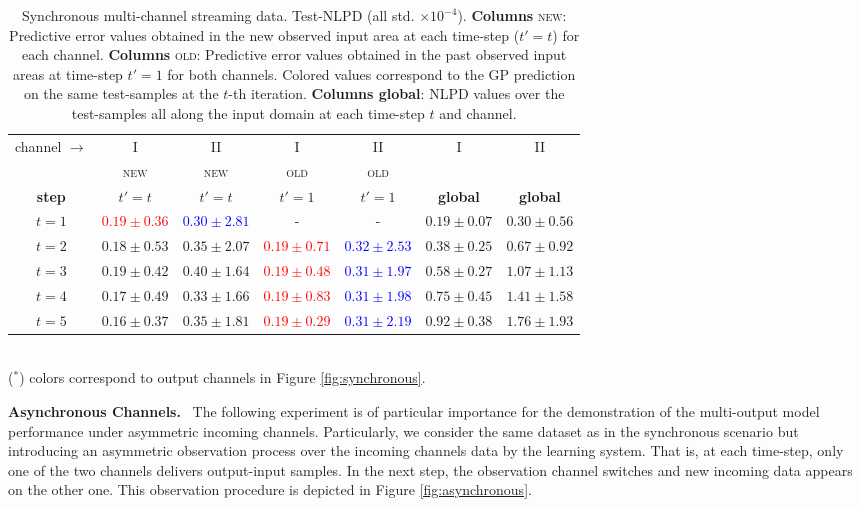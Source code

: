 \documentclass[]{article}
\begin{document}
\begin{table}[]
	\centering
	\caption{Synchronous multi-channel streaming data. Test-NLPD (all std. $\times 10^{-4}$). \textbf{Columns} \textsc{new}: Predictive error values obtained in the new observed input area at each time-step ($t'=t$) for each channel. \textbf{Columns} \textsc{old}: Predictive error values obtained in the past observed input areas at time-step $t'=1$ for both channels. Colored values correspond to the GP prediction on the same test-samples at the $t$-th iteration. \textbf{Columns global}: NLPD values over the test-samples all along the input domain at each time-step $t$ and channel.}
	\begin{tabular}{ccccccc}
		\toprule
		channel $\rightarrow$& I &II& I& II & I & II\\
		& \textsc{new} & \textsc{new}  & \textsc{old} & \textsc{old} &  &\\
		\textbf{step} & $t'=t$ &  $t'=t$ & $t'=1$ & $t'=1$ & \textbf{global} & \textbf{global}\\
		\midrule
		$t=1$ & \textcolor{red}{$\mathbf{0.19 \pm 0.36}$} & \textcolor{blue}{$\mathbf{0.30 \pm 2.81}$} & - & - & $0.19 \pm 0.07$ & $0.30 \pm 0.56$ \\
		$t=2$ & $0.18 \pm 0.53$ & $0.35 \pm 2.07$ & \textcolor{red}{$0.19 \pm 0.71$} & \textcolor{blue}{$0.32 \pm 2.53$} &$0.38 \pm 0.25$& $0.67 \pm 0.92$ \\
		$t=3$ & $0.19 \pm 0.42$ & $0.40\pm 1.64$ & \textcolor{red}{$0.19 \pm 0.48$} & \textcolor{blue}{$0.31 \pm 1.97$} & $0.58 \pm 0.27$& $1.07 \pm 1.13$\\
		$t=4$ & $0.17 \pm 0.49$ & $0.33 \pm 1.66$ & \textcolor{red}{$0.19 \pm 0.83$} & \textcolor{blue}{$0.31 \pm 1.98$} &$0.75 \pm 0.45$ & $1.41 \pm 1.58$\\
		$t=5$ & $0.16 \pm 0.37$ & $0.35 \pm 1.81$ & \textcolor{red}{$0.19 \pm 0.29$} & \textcolor{blue}{$0.31 \pm 2.19$} &$0.92 \pm 0.38$ &$1.76\pm 1.93$\\
		\bottomrule
	\end{tabular}\\
	\footnotesize{($^*$) colors correspond to output channels in Figure \ref{fig:synchronous}}. 
	\label{tab:synchronous}	
\end{table}

\textbf{Asynchronous Channels.}~ The following experiment is of particular importance for the demonstration of the multi-output model performance under asymmetric incoming channels. Particularly, we consider the same dataset as in the synchronous scenario but introducing an asymmetric observation process over the incoming channels data by the learning system. That is, at each time-step, only one of the two channels delivers output-input samples. In the next step, the observation channel switches and new incoming data appears on the other one. This observation procedure is depicted in Figure \ref{fig:asynchronous}.
\end{document}
